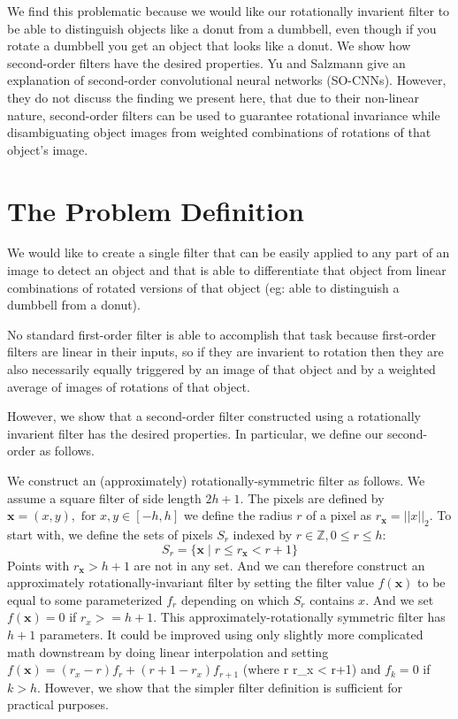 \documentclass{article}
\begin{document}
We find this problematic because we would like our rotationally invarient filter to be able to distinguish objects like a donut from a dumbbell, even though if you rotate a dumbbell you get an object that looks like a donut.
We show how second-order filters have the desired properties.
Yu and Salzmann \cite{yusalzmann} give an explanation of second-order convolutional neural networks (SO-CNNs). 
However, they do not discuss the finding we present here, that due to their non-linear nature, second-order filters can be used to guarantee rotational invariance while disambiguating object images from weighted combinations of rotations of that object's image.

\section{The Problem Definition}
We would like to create a single filter that can be easily applied to any part of an image to detect an object and that is able to differentiate that object from linear combinations of rotated versions of that object (eg: able to distinguish a dumbbell from a donut).

No standard first-order filter is able to accomplish that task because first-order filters are linear in their inputs, so if they are invarient to rotation then they are also necessarily equally triggered by an image of that object and by a weighted average of images of rotations of that object.

However, we show that a second-order filter constructed using a rotationally invarient filter has the desired properties. In particular, we define our second-order as follows.

We construct an (approximately) rotationally-symmetric filter as follows. 
We assume a square filter of side length $2h + 1$. 
The pixels are defined by $\mathbf x = (x,y),\text{ for } x,y\in [-h,h]$ we define the radius $r$ of a pixel as $r_{\mathbf{x}} = ||x||_2$. 
To start with, we define the sets of pixels $S_r$ indexed by $r \in \mathbb Z, 0\le r \le h$:
\[S_r = \{\mathbf{x} \mid r \le r_{\mathbf{x}} < r+1\}\]
Points with $r_{\mathbf{x}} > h + 1$ are not in any set.
And we can therefore construct an approximately rotationally-invariant filter by setting the filter value $f(\mathbf{x})$ to be equal to some parameterized $f_r$ depending on which $S_r$ contains $x$. And we set $f(\mathbf{x}) = 0$ if $r_x >= h + 1$.
This approximately-rotationally symmetric filter has $h+1$ parameters. It could be improved using only slightly more complicated math downstream by doing linear interpolation and setting
$f(\mathbf{x}) = (r_x - r)f_r + (r + 1 - r_x)f_{r+1}$ (where r \le r_x < r+1) and $f_{k} = 0$ if $k > h$.
However, we show that the simpler filter definition is sufficient for practical purposes.








{}

\end{document}
